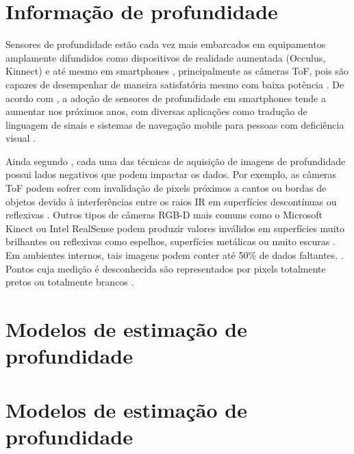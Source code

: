 \section{Informação de profundidade}
Sensores de profundidade estão cada vez mais embarcados em equipamentos amplamente difundidos como dispositivos de realidade aumentada (Occulus, Kinnect) e até mesmo em smartphones \cite{du2020depthlab}, principalmente as câmeras ToF, pois são capazes de desempenhar de maneira satisfatória mesmo com baixa potência \cite{branscombe2018microsoft}. De acordo com \cite{xie2021ultradepth}, a adoção de sensores de profundidade em smartphones tende a aumentar nos próximos anos, com diversas aplicações como tradução de linguagem de sinais \cite{park2021enabling} e sistemas de navegação mobile para pessoas com deficiência visual \cite{see2022smartphone}.


Ainda segundo \cite{castellano2023performance}, cada uma das técnicas de aquisição de imagens de profundidade possui lados negativos que podem impactar os dados. Por exemplo, as câmeras ToF podem sofrer com invalidação de pixels próximos a cantos ou bordas de objetos devido à interferências entre os raios IR em superfícies descontínuas ou reflexivas \cite{hansard2012time}. Outros tipos de câmeras RGB-D mais comuns como o Microsoft Kinect ou Intel RealSense podem produzir valores inválidos em superfícies muito brilhantes ou reflexivas como espelhos, superfícies metálicas ou muito escuras \cite{zollhofer2019commodity}. Em ambientes internos, tais imagens podem conter até 50\% de dados faltantes. \cite{zhang2022indepth} \cite{zhang2018deep}. Pontos cuja medição é desconhecida são representados por pixels totalmente pretos ou totalmente brancos \cite{dourado2020multi}.
\section{Modelos de estimação de profundidade}


\section{Modelos de estimação de profundidade}